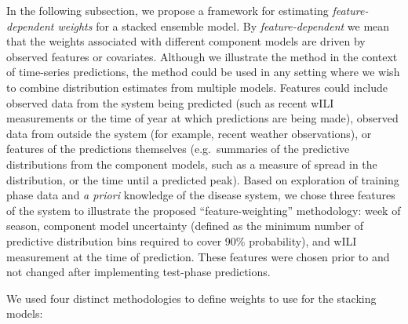 \documentclass[10pt,letterpaper]{article}
\begin{document}
In the following subsection, we propose a framework for estimating
\emph{feature-dependent weights} for a stacked ensemble model. By
\emph{feature-dependent} we mean that the weights associated with
different component models are driven by observed features or
covariates. Although we illustrate the method in the context of
time-series predictions, the method could be used in any setting where
we wish to combine distribution estimates from multiple models. Features
could include observed data from the system being predicted (such as
recent wILI measurements or the time of year at which predictions are
being made), observed data from outside the system (for example, recent
weather observations), or features of the predictions themselves
(e.g.~summaries of the predictive distributions from the component
models, such as a measure of spread in the distribution, or the time
until a predicted peak). Based on exploration of training phase data and
\emph{a priori} knowledge of the disease system, we chose three features
of the system to illustrate the proposed ``feature-weighting''
methodology: week of season, component model uncertainty (defined as the
minimum number of predictive distribution bins required to cover 90\%
probability), and wILI measurement at the time of prediction. These
features were chosen prior to and not changed after implementing
test-phase predictions.

We used four distinct methodologies to define weights to use for the
stacking models:
\end{document}
